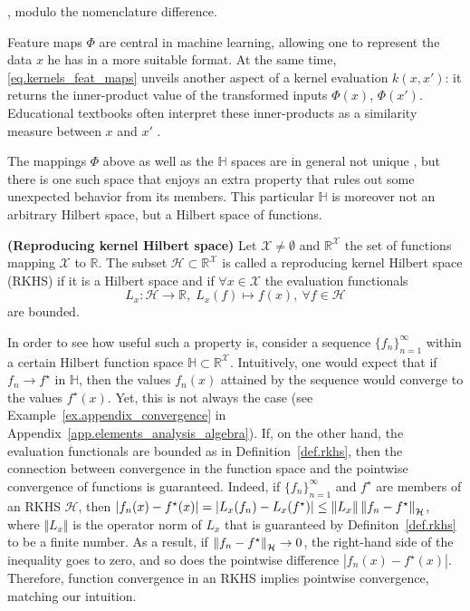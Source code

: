 \begin{my_proof}
	\cite[Theorem~4.16]{steinwart2008svm_book}, modulo the nomenclature difference.
\end{my_proof}

Feature maps $\Phi$ are central in machine learning, allowing one to represent the data $x$ he has in a more suitable format. At the same time, \eqref{eq.kernels_feat_maps} unveils another aspect of a kernel evaluation $k(x,x')$: it returns the inner-product value of the transformed inputs $\Phi(x)$, $\Phi(x')$. Educational textbooks often interpret these inner-products as a similarity measure between $x$ and $x'$ \citep{scholkopf2002learning}.

The mappings $\Phi$ above as well as the $\mathbb{H}$ spaces are in general not unique \citep[§4]{steinwart2008svm_book}, but there is one such space that enjoys an extra property that rules out some unexpected behavior from its members. This particular $\mathbb{H}$ is moreover not an arbitrary Hilbert space, but a Hilbert space of functions.

\begin{definition}
	\label{def.rkhs}
	\textbf{(Reproducing kernel Hilbert space)} 
	Let $\mathcal{X} \neq \emptyset$ and $\mathbb{R}^\mathcal{X}$ the set of functions mapping $\mathcal{X}$ to $\mathbb{R}$. The subset $\mathcal{H} \subset \mathbb{R}^\mathcal{X}$ is called a reproducing kernel Hilbert space (RKHS) if it is a Hilbert space and if $\forall x \in \mathcal{X}$ the evaluation functionals
	\begin{equation}
		L_x: \mathcal{H} \rightarrow \mathbb{R}, \; L_x(f) \mapsto f(x), \ \forall f\in \mathcal{H}
	\end{equation}
	are bounded.
\end{definition}

In order to see how useful such a property is, consider a sequence $\{f_n\}_{n=1}^\infty$ within a certain Hilbert function space $\mathbb{H} \subset \mathbb{R}^\mathcal{X}$. Intuitively, one would expect that if $f_n \rightarrow f^\star$ in $\mathbb{H}$, then the values $f_n(x)$ attained by the sequence would converge to the values $f^\star(x)$. Yet, this is not always the case (see Example~\ref{ex.appendix_convergence} in Appendix~\ref{app.elements_analysis_algebra}). If, on the other hand, the evaluation functionals are bounded as in Definition~\ref{def.rkhs}, then the connection between convergence in the function space and the pointwise convergence of functions is guaranteed. Indeed, if $\{f_n\}_{n=1}^\infty$ and $f^\star$ are members of an RKHS $\mathcal{H}$, then $|f_n(x)-f^\star(x)| = | L_x(f_n) - L_x(f^\star)|  \leq \Vert L_x \Vert \left\| f_n - f^\star \right\|_\mathcal{H}$, where $\Vert L_x \Vert $ is the operator norm of $L_x$ that is guaranteed by Definiton~\ref{def.rkhs} to be a finite number. As a result, if $\left\| f_n - f^\star \right\|_\mathcal{H} \rightarrow 0$, the right-hand side of the inequality goes to zero, and so does the pointwise difference $|f_n(x)-f^\star(x)|$. Therefore, function convergence in an RKHS implies pointwise convergence, matching our intuition.

